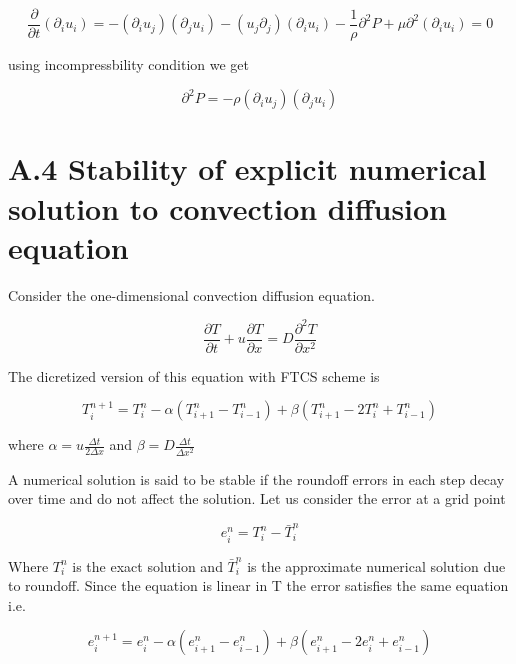 \documentclass{article}		%
\begin{document}
$$
\frac{\partial }{\partial t} (\partial_i  u_i) = - (\partial_i u_j)(\partial_j  u_i)- (u_j\partial_j)( \partial_i u_i) - \frac{1}{\rho} \partial^2P  + \mu \partial^2 (\partial_i u_i) =0
$$

using incompressbility condition we get 

\begin{equation}
\partial^2P  = - \rho (\partial_i u_j)(\partial_j  u_i)
\end{equation}

\section*{A.4  Stability of explicit numerical solution to convection diffusion equation } 		

Consider the one-dimensional convection diffusion equation.

\begin{equation}
\frac{\partial  T }{\partial t} + u\frac{\partial  T }{\partial x} = D \frac{\partial^2  T }{\partial x^2} 
\end{equation}

The dicretized version of this equation with FTCS scheme is 

\begin{equation}
T_i^{n+1} = T_i^n - \alpha\left(T_{i+1}^{n} - T_{i-1}^{n}\right) + \beta \left( T_{i+1}^{n} - 2T_{i}^{n} + T_{i-1}^{n}\right) 
\end{equation}

where $ \alpha  = u \frac{\Delta t}{2 \Delta x} $ and $ \beta  = D \frac{\Delta t }{\Delta x^2} $

A numerical solution is said to be stable if the roundoff errors in each step decay over time and do not affect the solution. Let us consider the error at a grid point

\begin{equation}
e_i^n = T_i^n - \bar{T}_i^n
\end{equation}

Where $T_i^n$ is the exact solution and $\bar{T}_i^n$ is the approximate numerical solution due to roundoff. Since the equation is linear in T the error satisfies the same equation i.e. 

\begin{equation}
e_i^{n+1} = e_i^n - \alpha\left(e_{i+1}^{n} - e_{i-1}^{n}\right) + \beta \left( e_{i+1}^{n} - 2e_{i}^{n} + e_{i-1}^{n}\right) 
\end{equation}
\end{document}
